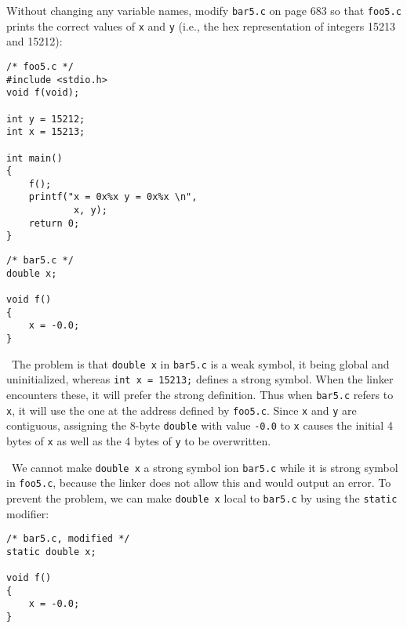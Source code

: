 \documentclass[12pt]{article}
\newenvironment{ex}[2][Exercise]{\begin{trivlist}
		\item[\hskip \labelsep {\bfseries #1}\hskip \labelsep {\bfseries #2.}]}{\end{trivlist}}
\newenvironment{sol}[1][Solution]{\begin{trivlist}
		\item[\hskip \labelsep {\bfseries #1:}]}{\end{trivlist}}
\begin{document}
\begin{ex}{7.7}
	Without changing any variable names, modify \texttt{bar5.c} on page 683 so that \texttt{foo5.c}
	prints the correct values of \texttt{x} and \texttt{y} (i.e., the hex representation of integers
	15213 and 15212):
	\begin{lstlisting}
/* foo5.c */
#include <stdio.h>
void f(void);

int y = 15212;
int x = 15213;

int main()
{
	f();
	printf("x = 0x%x y = 0x%x \n",
			x, y);
	return 0;
}
	\end{lstlisting}
	\begin{lstlisting}
/* bar5.c */
double x;

void f()
{
	x = -0.0;
}
	\end{lstlisting}
\end{ex}

\begin{sol}
	\
	The problem is that \texttt{double x} in \texttt{bar5.c} is a weak symbol, it being global and
	uninitialized, whereas \texttt{int x = 15213;} defines a strong symbol. When the linker encounters
	these, it will prefer the strong definition. Thus when \texttt{bar5.c} refers to \texttt{x}, it
	will use the one at the address defined by \texttt{foo5.c}. Since \texttt{x} and \texttt{y}
	are contiguous, assigning the 8-byte \texttt{double} with value \texttt{-0.0} to \texttt{x}
	causes the initial 4 bytes of \texttt{x} as well as the 4 bytes of \texttt{y} to be overwritten.
	
	\
	We cannot make \texttt{double x} a strong symbol ion \texttt{bar5.c} while it is strong symbol in
	\texttt{foo5.c}, because the linker does not allow this and would output an error. To prevent
	the problem, we can make \texttt{double x} local to \texttt{bar5.c} by using the \texttt{static} modifier:
	\begin{lstlisting}
/* bar5.c, modified */
static double x;

void f()
{
	x = -0.0;
}
	\end{lstlisting}
\end{sol}
\end{document}
